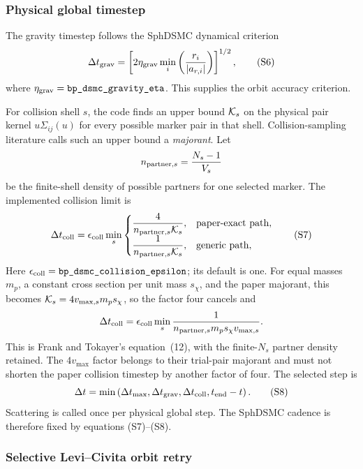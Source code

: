 \subsubsection{Physical global timestep}

The gravity timestep follows the SphDSMC dynamical criterion
\[
 \Delta t_{\rm grav}
 =\left[
 2\eta_{\rm grav}
 \min_i\left(\frac{r_i}{|a_{r,i}|}\right)
 \right]^{1/2},                                            \tag{S6}
\]
where \(\eta_{\rm grav}=\code{bp_dsmc_gravity_eta}\).  This supplies the orbit
accuracy criterion.

For collision shell \(s\), the code finds an upper bound
\({\cal K}_s\) on the physical pair kernel
\(u\Sigma_{ij}(u)\) for every possible marker pair in
that shell.  Collision-sampling literature calls such an upper bound a
\emph{majorant}.  Let
\[
 n_{{\rm partner},s}=\frac{N_s-1}{V_s}
\]
be the finite-shell density of possible partners for one selected marker.
The implemented collision limit is
\[
 \Delta t_{\rm coll}
 =\epsilon_{\rm coll}\min_s
 \begin{cases}
 \displaystyle
 \frac{4}{n_{{\rm partner},s}{\cal K}_s},
     &\text{paper-exact path},\\[1.1ex]
 \displaystyle
 \frac{1}{n_{{\rm partner},s}{\cal K}_s},
     &\text{generic path},
 \end{cases}                                               \tag{S7}
\]
Here
\(\epsilon_{\rm coll}=\code{bp_dsmc_collision_epsilon}\); its default is one.
For equal masses \(m_p\), a constant cross section per unit mass
\(s_\chi\), and the paper majorant, this becomes
\({\cal K}_s=4v_{\max,s}m_ps_\chi\), so the factor four cancels and
\[
 \Delta t_{\rm coll}
 =\epsilon_{\rm coll}
  \min_s\frac{1}{n_{{\rm partner},s}m_ps_\chi v_{\max,s}}.
\]
This is Frank and Tokayer's equation~(12), with the finite-\(N_s\) partner
density retained.  The \(4v_{\max}\) factor belongs to their trial-pair
majorant and must not shorten the paper collision timestep by another factor
of four.  The selected step is
\[
 \Delta t=\min\left(
 \Delta t_{\max},\Delta t_{\rm grav},\Delta t_{\rm coll},
 t_{\rm end}-t\right).                                     \tag{S8}
\]
Scattering is called once per physical global step.  The SphDSMC cadence is
therefore fixed by equations (S7)--(S8).

\subsubsection{Selective Levi--Civita orbit retry}

